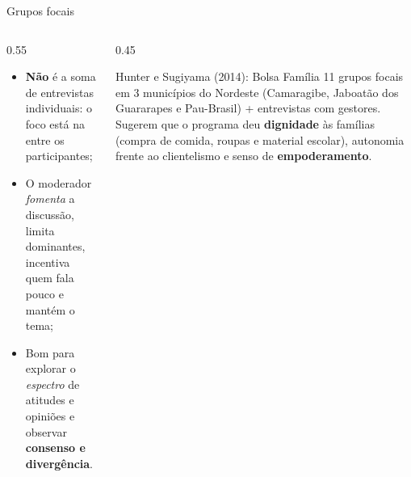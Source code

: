 \begin{frame}{Grupos focais}
  \begin{columns}[T]
    \begin{column}{0.55\textwidth}
      \begin{itemize}
        \item \textbf{Não} é a soma de entrevistas individuais: o foco está na  entre os participantes;
        \item O moderador \emph{fomenta} a discussão, limita dominantes, incentiva quem fala pouco e mantém o tema;
        \item Bom para explorar o \emph{espectro} de atitudes e opiniões e observar \textbf{consenso e divergência}.
      \end{itemize}
    \end{column}
    \begin{column}{0.45\textwidth}
      \begin{block}{Hunter e Sugiyama (2014): Bolsa Família}
        \footnotesize
        11 grupos focais em 3 municípios do Nordeste (Camaragibe, Jaboatão dos Guararapes e Pau-Brasil) + entrevistas com gestores. Sugerem que o programa deu \textbf{dignidade} às famílias (compra de comida, roupas e material escolar), autonomia frente ao clientelismo e senso de \textbf{empoderamento}.
      \end{block}
    \end{column}
  \end{columns}
\end{frame}

